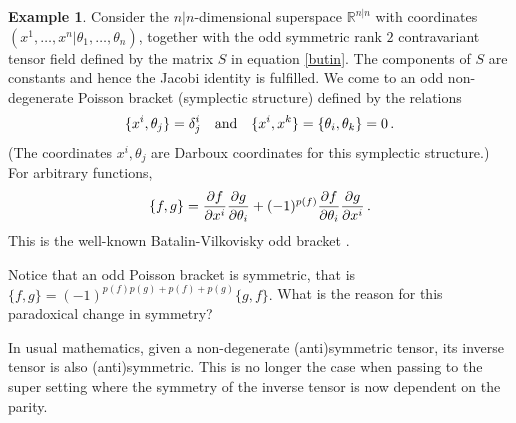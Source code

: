 \documentclass[12pt,reqno,a4paper]{amsart}
\theoremstyle{definition}
\newtheorem{example}{Example}[section]
\begin{document}
\begin{example}\label{odd}
Consider the $n|n$-dimensional superspace ${\mathbb{R}}^{n|n}$ with coordinates
$(x^1,\dots,x^n|\theta_1,\dots,\theta_n)$, together with the odd symmetric
rank $2$ contravariant tensor field defined by the matrix $S$ in equation \eqref{butin}.
The components of $S$ are constants and hence the Jacobi identity is
fulfilled. We come to an odd non-degenerate Poisson bracket (symplectic structure)
 defined by the relations
         \begin{equation*}
  \{x^i,\theta_j\}=\delta^i_{j}\quad {\rm and}\quad
  \{x^i,x^k\}=\{\theta_i,\theta_k\}=0\,.
       \end{equation*}
(The coordinates $x^i,\theta_j$ are Darboux coordinates
for this symplectic structure.)  
For arbitrary functions,
    \begin{equation*}
    \{f,g\}=
   {{\partial} f\over {\partial} x^i}{{\partial} g\over {\partial} \theta_i}+
        (-1)^{p(f)}{{\partial} f\over {\partial} \theta_i}
        {{\partial} g\over {\partial} x^i}\,.
    \end{equation*}
This is the well-known Batalin-Vilkovisky odd bracket \cite{BV}.

\end{example}

 Notice that an odd Poisson 
bracket is symmetric, that is
    $
    \{f,g\} = (-1)^{p(f)p(g) + p(f) + p(g)}\{g,f\}.
    $
What is the reason for this paradoxical change in symmetry?

  In usual mathematics,
 given a non-degenerate (anti)symmetric tensor,
its inverse tensor is also
  (anti)symmetric. This is no longer the case when passing to
the super setting
where the symmetry of the inverse tensor is now dependent on the parity.
\end{document}
